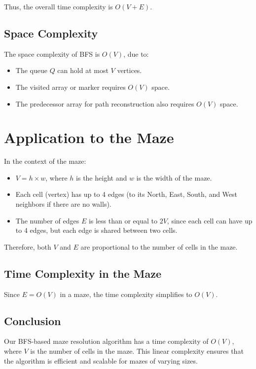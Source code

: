\documentclass{article}
\begin{document}
Thus, the overall time complexity is \(O(V + E)\).

\subsection*{Space Complexity}

The space complexity of BFS is \(O(V)\), due to:

\begin{itemize}
    \item The queue \(Q\) can hold at most \(V\) vertices.
    \item The visited array or marker requires \(O(V)\) space.
    \item The predecessor array for path reconstruction also requires \(O(V)\) space.
\end{itemize}

\section*{Application to the Maze}

In the context of the maze:

\begin{itemize}
    \item \(V = h \times w\), where \(h\) is the height and \(w\) is the width of the maze.
    \item Each cell (vertex) has up to 4 edges (to its North, East, South, and West neighbors if there are no walls).
    \item The number of edges \(E\) is less than or equal to \(2V\), since each cell can have up to 4 edges, but each edge is shared between two cells.
\end{itemize}

Therefore, both \(V\) and \(E\) are proportional to the number of cells in the maze.

\subsection*{Time Complexity in the Maze}

Since \(E = O(V)\) in a maze, the time complexity simplifies to \(O(V)\).

\subsection*{Conclusion}

Our BFS-based maze resolution algorithm has a time complexity of \(O(V)\), where \(V\) is the number of cells in the maze. This linear complexity ensures that the algorithm is efficient and scalable for mazes of varying sizes.
\end{document}
